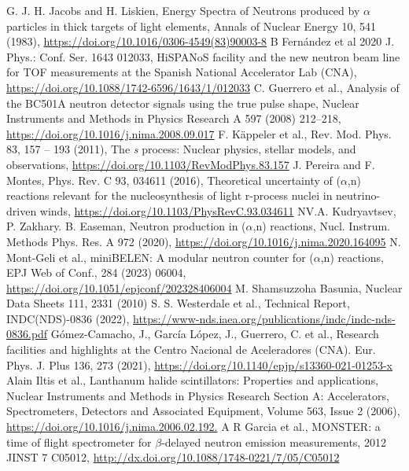 \documentclass[a4paper,12pt]{report}
\newcommand{\an}{($\alpha$,n) }
\begin{document}
\begin{thebibliography}{5}
	G. J. H. Jacobs and H. Liskien, Energy Spectra of Neutrons produced by $\alpha$ particles in thick targets of light elements, Annals of Nuclear Energy 10, 541 (1983), \url{https://doi.org/10.1016/0306-4549(83)90003-8}
	B Fernández et al 2020 J. Phys.: Conf. Ser. 1643 012033, HiSPANoS facility and the new neutron beam line for TOF measurements at the Spanish National Accelerator Lab (CNA), \url{https://doi.org/10.1088/1742-6596/1643/1/012033}
	C. Guerrero et al., Analysis of the BC501A neutron detector signals using the true pulse shape, Nuclear Instruments and Methods in Physics Research A 597 (2008) 212–218, \url{https://doi.org/10.1016/j.nima.2008.09.017}
	F. Käppeler et al., Rev. Mod. Phys. 83, 157 – 193 (2011), The \textit{s} process: Nuclear physics, stellar models, and observations, \url{https://doi.org/10.1103/RevModPhys.83.157}
	J. Pereira and F. Montes, Phys. Rev. C 93, 034611 (2016), Theoretical uncertainty of \an reactions relevant for the nucleosynthesis of light r-process nuclei in neutrino-driven winds, \url{https://doi.org/10.1103/PhysRevC.93.034611}
	NV.A. Kudryavtsev, P. Zakhary. B. Easeman, Neutron production in \an reactions, Nucl. Instrum. Methods Phys. Res. A 972 (2020), \url{https://doi.org/10.1016/j.nima.2020.164095}
	N. Mont-Geli et al., miniBELEN: A modular neutron counter for \an reactions, EPJ Web of Conf., 284 (2023) 06004, \url{https://doi.org/10.1051/epjconf/202328406004}
	M. Shamsuzzoha Basunia, Nuclear Data Sheets 111, 2331 (2010)
	S. S. Westerdale et al., Technical Report, INDC(NDS)-0836 (2022), \url{https://www-nds.iaea.org/publications/indc/indc-nds-0836.pdf}
	Gómez-Camacho, J., García López, J., Guerrero, C. et al., Research facilities and highlights at the Centro Nacional de Aceleradores (CNA). Eur. Phys. J. Plus 136, 273 (2021), \url{https://doi.org/10.1140/epjp/s13360-021-01253-x}
	Alain Iltis et al., Lanthanum halide scintillators: Properties and applications, Nuclear Instruments and Methods in Physics Research Section A: Accelerators, Spectrometers, Detectors and Associated Equipment, Volume 563, Issue 2 (2006), \url{https://doi.org/10.1016/j.nima.2006.02.192.}
	A R Garcia et al., MONSTER: a time of flight spectrometer for $\beta$-delayed neutron emission measurements, 2012 JINST 7 C05012, \url{http://dx.doi.org/10.1088/1748-0221/7/05/C05012}

\end{thebibliography}
\end{document}
